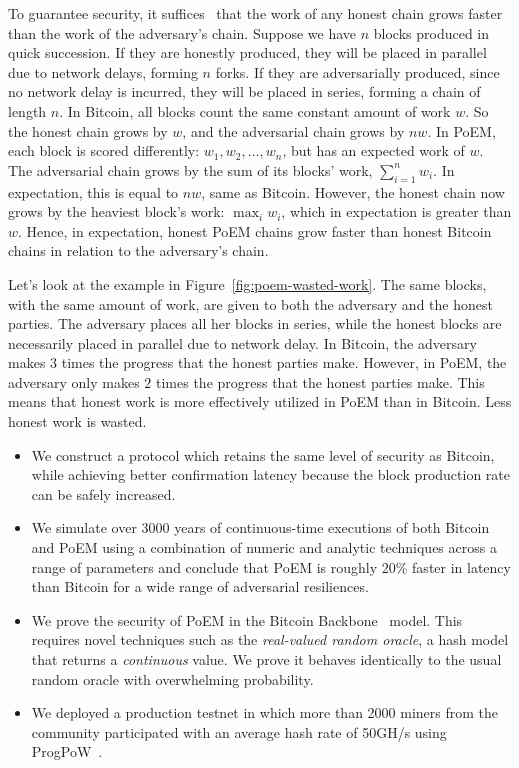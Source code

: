 To guarantee security, it suffices~\cite{eiar} that the work of any honest chain grows
faster than the work of the adversary's chain.
Suppose we have $n$ blocks produced in quick succession.
If they are honestly produced, they will be placed in parallel due to network delays,
forming $n$ forks.
If they are adversarially produced, since no network delay is incurred, they will be placed in series,
forming a chain of length $n$.
In Bitcoin, all blocks count the same constant amount of work $w$. So the honest chain grows by $w$,
and the adversarial chain grows by $n w$.
In PoEM, each block is scored differently: $w_1, w_2, \dots, w_n$, but has an expected work of $w$.
The adversarial chain grows by the sum of its blocks' work, $\sum_{i=1}^n w_i$.
In expectation, this is equal to $n w$, same as Bitcoin.
However, the honest chain now grows by the heaviest block's work: $\max_i w_i$,
which in expectation is greater than $w$. Hence, in expectation, honest PoEM chains grow
faster than honest Bitcoin chains in relation to the adversary's chain.

Let's look at the example in Figure~\ref{fig:poem-wasted-work}.
The same blocks, with the same amount of work, are given to both the adversary and the honest parties.
The adversary places all her blocks in series, while the honest blocks are necessarily placed in parallel
due to network delay.
In Bitcoin, the adversary makes $3$ times the progress that the honest parties make.
However, in PoEM, the adversary only makes $2$ times the progress that the honest parties make.
This means that honest work is more effectively utilized in PoEM than in Bitcoin.
Less honest work is wasted.

\noindent
{}
\begin{itemize}
  \item We construct a protocol which retains the same level of security as Bitcoin, while achieving
        better confirmation latency because the block production rate can be safely increased.

  \item We simulate over 3000 years of continuous-time executions of both Bitcoin and PoEM
        using a combination of numeric and analytic techniques across a range of parameters
        and conclude that PoEM is roughly $20\%$ faster in latency than Bitcoin for a wide
        range of adversarial resiliences. %

  \item We prove the security of PoEM in the Bitcoin Backbone~\cite{backbone} model. This
        requires novel techniques such as the
        \emph{real-valued random oracle}, a hash model that returns a \emph{continuous} value.
        We prove it behaves identically to the usual random oracle with overwhelming probability.

  \item We deployed a production testnet in which
        more than 2000 miners from the community participated
        with an average hash rate of 50GH/s using ProgPoW~\cite{progpow}.
\end{itemize}


